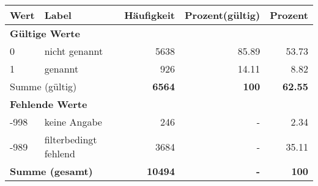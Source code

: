      \begin{longtable}{lXrrr}
     \toprule
     \textbf{Wert} & \textbf{Label} & \textbf{Häufigkeit} & \textbf{Prozent(gültig)} & \textbf{Prozent} \\
     \endhead
     \midrule
     \multicolumn{5}{l}{\textbf{Gültige Werte}}\\

     0 &
     \multicolumn{1}{X}{ nicht genannt   } &


       \num{5638} &
       \num[round-mode=places,round-precision=2]{85.89} &
         \num[round-mode=places,round-precision=2]{53.73} \\

     1 &
     \multicolumn{1}{X}{ genannt   } &


       \num{926} &
       \num[round-mode=places,round-precision=2]{14.11} &
         \num[round-mode=places,round-precision=2]{8.82} \\
     \midrule
     \multicolumn{2}{l}{Summe (gültig)} &
       \textbf{\num{6564}} &
     \textbf{\num{100}} &
       \textbf{\num[round-mode=places,round-precision=2]{62.55}} \\
     \multicolumn{5}{l}{\textbf{Fehlende Werte}}\\
       -998 &
       keine Angabe &
         \num{246} &
        - &
         \num[round-mode=places,round-precision=2]{2.34} \\
       -989 &
       filterbedingt fehlend &
         \num{3684} &
        - &
         \num[round-mode=places,round-precision=2]{35.11} \\
     \midrule
     \multicolumn{2}{l}{\textbf{Summe (gesamt)}} &
          \textbf{\num{10494}} &
        \textbf{-} &
        \textbf{\num{100}} \\
     \bottomrule
     \end{longtable}
     
